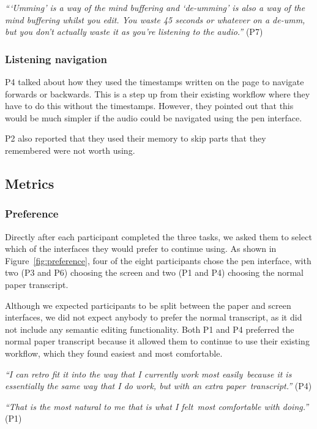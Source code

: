 \textit{```Umming' is a way of the mind buffering and `de-umming' is also a way of the mind buffering whilst you edit.
You waste 45 seconds or whatever on a de-umm, but you don't actually waste it as you're listening to the audio.''} (P7)

\subsubsection{Listening navigation}

P4 talked about how they used the timestamps written on the page to navigate forwards or backwards. This is a step up
from their existing workflow where they have to do this without the timestamps. However, they pointed out that this
would be much simpler if the audio could be navigated using the pen interface.

P2 also reported that they used their memory to skip parts that they remembered were not worth using.

\subsection{Metrics}

\subsubsection{Preference}

Directly after each participant completed the three tasks, we asked them to select which of the interfaces they would
prefer to continue using. As shown in Figure~\ref{fig:preference}, four of the eight participants chose the pen
interface, with two (P3 and P6) choosing the screen and two (P1 and P4) choosing the normal paper transcript.

Although we expected participants to be split between the paper and screen interfaces, we did not expect anybody to
prefer the normal transcript, as it did not include any semantic editing functionality.  Both P1 and P4 preferred the
normal paper transcript because it allowed them to continue to use their existing workflow, which they found easiest
and most comfortable.

\textit{``I can retro fit it into the way that I currently work most easily because it is essentially the same way that
I do work, but with an extra paper transcript.''} (P4)

\textit{``That is the most natural to me that is what I felt most comfortable with doing.''} (P1)

